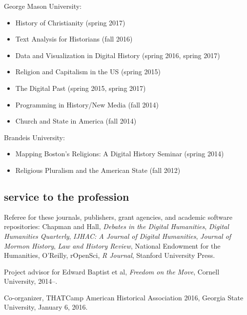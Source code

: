 \documentclass[11pt]{article}
\providecommand{\tightlist}{%
  \setlength{\itemsep}{0pt}\setlength{\parskip}{0pt}}
\begin{document}
George Mason University:

\vspace{-0.15in}

\begin{itemize}
    \tightlist
  \item History of Christianity (spring 2017)
  \item Text Analysis for Historians (fall 2016)
  \item Data and Visualization in Digital History (spring 2016, spring 2017)
  \item Religion and Capitalism in the US (spring 2015) 
  \item The Digital Past (spring 2015, spring 2017)
  \item Programming in History/New Media (fall 2014) 
  \item Church and State in America (fall 2014)
\end{itemize}

\vspace{-0.1in}

Brandeis University:

\vspace{-0.15in}

\begin{itemize}
    \tightlist
  \item
    Mapping Boston's Religions: A Digital History Seminar (spring 2014)
  \item
    Religious Pluralism and the American State (fall 2012)
\end{itemize}

\subsection{service to the profession}\label{service-profession}

Referee for these journals, publishers, grant agencies, and academic software 
repositories: Chapman and Hall, \emph{Debates in the Digital Humanities}, 
\emph{Digital Humanities Quarterly}, \emph{IJHAC: A Journal of Digital 
  Humanities}, \emph{Journal of Mormon History}, \emph{Law and History 
  Review}, National Endowment for the Humanities, O'Reilly, rOpenSci, \emph{R Journal}, Stanford University Press.

Project advisor for Edward Baptist et al, \emph{Freedom on the Move}, Cornell 
University, 2014--.

Co-organizer, THATCamp American Historical Association 2016, Georgia State University, January 6, 2016.
\end{document}
